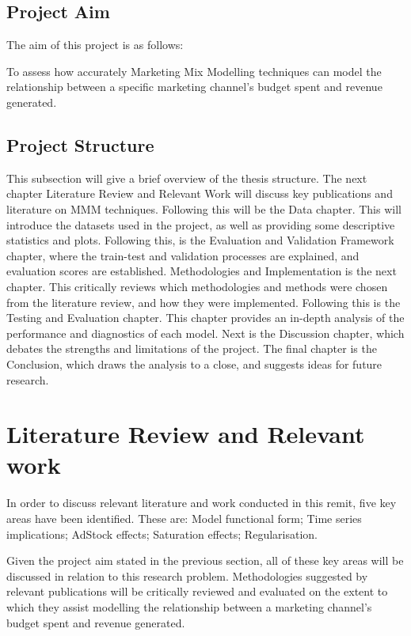 \documentclass[11pt, a4paper]{article}
\begin{document}
\subsection{Project Aim}
The aim of this project is as follows:

To assess how accurately Marketing Mix Modelling techniques can model the relationship between a specific marketing channel’s budget spent and revenue generated. 

\subsection{Project Structure }

This subsection will give a brief overview of the thesis structure. The next chapter Literature Review and Relevant Work will discuss key publications and literature on MMM techniques. Following this will be the Data chapter. This will introduce the datasets used in the project, as well as providing some descriptive statistics and plots. Following this, is the Evaluation and Validation Framework chapter, where the train-test and validation processes are explained, and evaluation scores are established. Methodologies and Implementation is the next chapter. This critically reviews which methodologies and methods were chosen from the literature review, and how they were implemented. Following this is the Testing and Evaluation chapter. This chapter provides an in-depth analysis of the performance and diagnostics of each model. Next is the Discussion chapter, which debates the strengths and limitations of the project. The final chapter is the Conclusion, which draws the analysis to a close, and suggests ideas for future research. 


\section{Literature Review and Relevant work }

In order to discuss relevant literature and work conducted in this remit, five key areas have been identified. These are: Model functional form; Time series implications; AdStock effects; Saturation effects; Regularisation.

Given the project aim stated in the previous section, all of these key areas will be discussed in relation to this research problem. Methodologies suggested by relevant publications will be critically reviewed and evaluated on the extent to which they assist modelling the relationship between a marketing channel’s budget spent and revenue generated.
\end{document}
